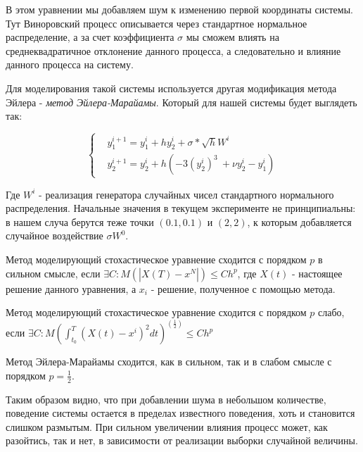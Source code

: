 В этом уравнении мы добавляем шум к изменению первой координаты
системы. Тут Виноровский процесс описывается через стандартное
нормальное распределение, а за счет коэффициента $\sigma$ мы
сможем влиять на среднеквадратичное отклонение данного процесса,
а следовательно и влияние данного процесса на систему.

Для моделирования такой системы используется другая
модификация метода Эйлера - \textit{метод Эйлера-Марайамы}.
Который для нашей системы будет выглядеть так:

\begin{equation}\label{lab9:eq:method}
\begin{cases}
    &y_1^{i+1} = y_1^i + h y_2^i + \sigma * \sqrt{h} W^i\\
    &y_2^{i+1} = y_2^i + h (-3(y_2^i)^3\ + \nu y_2^i - y_1^i)
\end{cases}
\end{equation}

Где $W^i$ - реализация генератора случайных чисел стандартного
нормального распределения. Начальные значения в текущем
эксперименте не принципиальны: в нашем случа берутся теже точки
$(0.1,0.1)$ и $(2,2)$, к которым добавляется случайное воздействие
$\sigma W^0$.

\begin{definition}
    Метод моделирующий стохастическое уравнение сходится с
    порядком $p$ в сильном смысле, если
    $\exists C : M(|X(T) - x^N|) \leq Ch^p$, где $X(t)$ - настоящее решение
    данного уравнения, а ${x}_i$ - решение, полученное с помощью метода.
\end{definition}

\begin{definition}
    Метод моделирующий стохастическое уравнение сходится с
    порядком $p$ слабо, если
    $\exists C : M(\int_{t_0}^T(X(t) - x^i)^2dt)^(\frac{1}{2}) \leq Ch^p$
\end{definition}

\begin{theorem}
    Метод Эйлера-Марайамы сходится, как в сильном, так и в слабом
    смысле с порядком $p = \frac{1}{2}$.
\end{theorem}


\clearpage
Таким образом видно, что при добавлении шума в небольшом количестве,
поведение системы остается в пределах известного поведения, хоть
и становится слишком размытым. При сильном увеличении влияния
процесс может, как разойтись, так и нет, в зависимости от
реализации выборки случайной величины.
